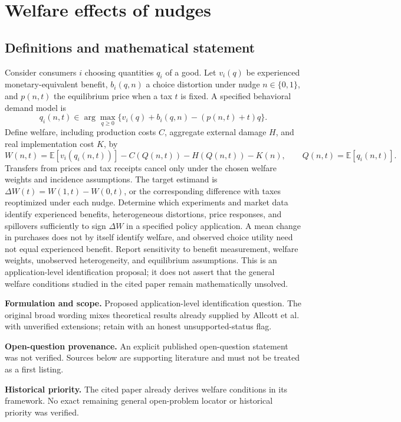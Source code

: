 \documentclass[11pt]{article}
\begin{document}
\section*{Welfare effects of nudges}\label{30007591}
\subsection{Definitions and mathematical statement}
Consider consumers \(i\) choosing quantities \(q_i\) of a good. Let \(v_i(q)\) be experienced monetary-equivalent benefit, \(b_i(q,n)\) a choice distortion under nudge \(n\in\{0,1\}\), and \(p(n,t)\) the equilibrium price when a tax \(t\) is fixed. A specified behavioral demand model is
\[q_i(n,t)\in\arg\max_{q\geq0}\{v_i(q)+b_i(q,n)-(p(n,t)+t)q\}.\]
Define welfare, including production costs \(C\), aggregate external damage \(H\), and real implementation cost \(K\), by
\[W(n,t)=\mathbb E[v_i(q_i(n,t))]-C(Q(n,t))-H(Q(n,t))-K(n),\qquad Q(n,t)=\mathbb E[q_i(n,t)].\]
Transfers from prices and tax receipts cancel only under the chosen welfare weights and incidence assumptions. The target estimand is \(\Delta W(t)=W(1,t)-W(0,t)\), or the corresponding difference with taxes reoptimized under each nudge. Determine which experiments and market data identify experienced benefits, heterogeneous distortions, price responses, and spillovers sufficiently to sign \(\Delta W\) in a specified policy application. A mean change in purchases does not by itself identify welfare, and observed choice utility need not equal experienced benefit. Report sensitivity to benefit measurement, welfare weights, unobserved heterogeneity, and equilibrium assumptions. This is an application-level identification proposal; it does not assert that the general welfare conditions studied in the cited paper remain mathematically unsolved.

\par\textbf{Formulation and scope.} Proposed application-level identification question. The original broad wording mixes theoretical results already supplied by Allcott et al. with unverified extensions; retain with an honest unsupported-status flag.

\par\textbf{Open-question provenance.} An explicit published open-question statement was not verified. Sources below are supporting literature and must not be treated as a first listing.

\par\textbf{Historical priority.} The cited paper already derives welfare conditions in its framework. No exact remaining general open-problem locator or historical priority was verified.
\end{document}
